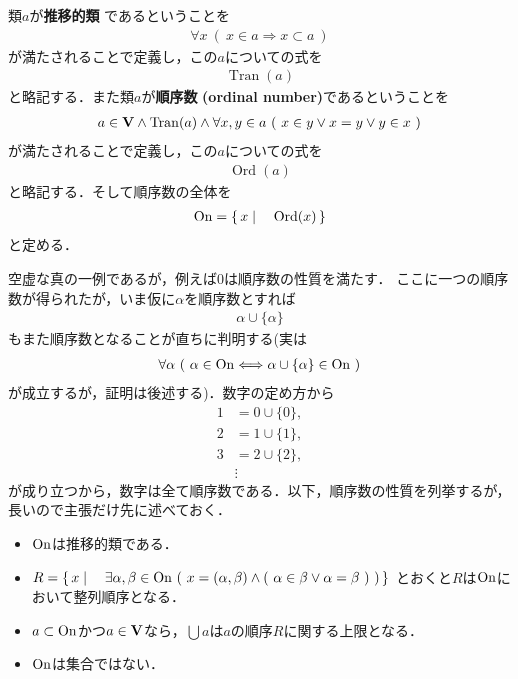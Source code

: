 	\begin{screen}
		\begin{dfn}[順序数]
			類$a$が{\bf 推移的類}
			であるということを
			\begin{align}
				\forall x\ (\ x \in a \Longrightarrow x \subset a\ )
			\end{align}
			が満たされることで定義し，この$a$についての式を
			\begin{align}
				\operatorname{Tran}(a)
			\end{align}
			と略記する．また類$a$が{\bf 順序数}
			{\bf (ordinal number)}であるということを
			\begin{align}
				a \in \mathbf{V} \wedge \operatorname{Tran}(a)
				\wedge \forall x,y \in a\ (\ x \in y \vee x = y \vee y \in x\ )
			\end{align}
			が満たされることで定義し，この$a$についての式を
			\begin{align}
				\operatorname{Ord}(a)
			\end{align}
			と略記する．そして順序数の全体を
			\begin{align}
				\mathrm{On} = \left\{\, x \mid \quad \operatorname{Ord}(x)\, \right\}
			\end{align}
			と定める．
		\end{dfn}
	\end{screen}
	
	空虚な真の一例であるが，例えば$0$は順序数の性質を満たす．
	ここに一つの順序数が得られたが，いま仮に$\alpha$を順序数とすれば
	\begin{align}
		\alpha \cup \{\alpha\}
	\end{align}
	もまた順序数となることが直ちに判明する(実は
	\begin{align}
		\forall \alpha\ (\ \alpha \in \mathrm{On} \Longleftrightarrow \alpha \cup \{\alpha\} \in \mathrm{On}\ )
	\end{align}
	が成立するが，証明は後述する)．数字の定め方から
	\begin{align}
		1 &= 0 \cup \{0\}, \\
		2 &= 1 \cup \{1\}, \\
		3 &= 2 \cup \{2\}, \\
		&\vdots
	\end{align}
	が成り立つから，数字は全て順序数である．以下，順序数の性質を列挙するが，長いので主張だけ先に述べておく．
	\begin{itemize}
		\item $\mathrm{On}$は推移的類である．
		\item $R = \Set{x}{\exists \alpha,\beta \in \ON\ 
			(\ x=(\alpha,\beta) \wedge (\ \alpha \in \beta \vee \alpha = \beta\ )\ )}$
			とおくと$R$は$\mathrm{On}$において整列順序となる．
		\item $a \subset \mathrm{On}$かつ$a \in \mathbf{V}$なら，$\bigcup a$は$a$の順序$R$に関する上限となる．
		\item $\mathrm{On}$は集合ではない．
	\end{itemize}
	
